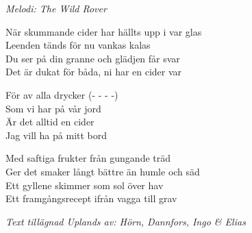 {\footnotesize\textit{Melodi: The Wild Rover}}\par
\vspace{10pt}
När skummande cider har hällts upp i var glas\\
Leenden tänds för nu vankas kalas\\
Du ser på din granne och glädjen får svar\\
Det är dukat för båda, ni har en cider var\par
\vspace{10pt}
\revrpt För av alla drycker (- - - -)\\
Som vi har på vår jord\\
Är det alltid en cider\\
Jag vill ha på mitt bord\rpt\par
\vspace{10pt}
Med saftiga frukter från gungande träd\\
Ger det smaker långt bättre än humle och säd\\
Ett gyllene skimmer som sol över hav\\
Ett framgångsrecept ifrån vagga till grav\par
\vspace{10pt}
{\footnotesize\textit{Text tillägnad Uplands av: Hörn, Dannfors, Ingo \& Elias}}
